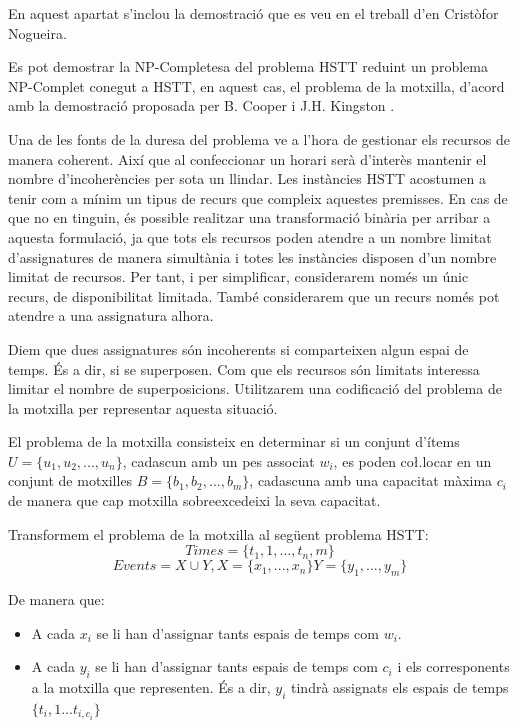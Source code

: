 \documentclass[11pt,a4paper,twoside]{report}
\begin{document}
    En aquest apartat s'inclou la demostració que es veu en el treball d'en Cristòfor Nogueira\cite{treballCristo}.
    
    Es pot demostrar la NP-Completesa del problema HSTT reduint un problema NP-Complet conegut a HSTT, en aquest cas, el problema de la motxilla\cite{wiki:bin}, d'acord amb la demostració proposada per B. Cooper i J.H. Kingston \cite{complexityHSTT}.

    Una de les fonts de la duresa del problema ve a l'hora de gestionar els recursos de manera coherent. Així que al confeccionar un horari serà d'interès mantenir el nombre d'incoherències per sota un llindar. 
    Les instàncies HSTT acostumen a tenir com a mínim un tipus de recurs que compleix aquestes premisses. 
    En cas de que no en tinguin, és possible realitzar una transformació binària per arribar a aquesta formulació, 
    ja que tots els recursos poden atendre a un nombre limitat d'assignatures de manera simultània i totes les instàncies disposen d'un nombre limitat de recursos. Per tant, i per simplificar, considerarem només un únic recurs, de disponibilitat limitada. També considerarem que un recurs només pot atendre a una assignatura alhora.

    Diem que dues assignatures són incoherents si comparteixen algun espai de temps. És a dir, si se superposen. Com que els recursos són limitats interessa limitar el nombre de superposicions. Utilitzarem una codificació del problema de la motxilla per representar aquesta situació.

    El problema de la motxilla consisteix en determinar si un conjunt d'ítems $U = \{u_1, u_2, ..., u_n\}$, cadascun amb un pes associat $w_i$, es poden co\l.locar en un conjunt de motxilles $B = \{b_1, b_2, ..., b_m\}$, 
    cadascuna amb una capacitat màxima $c_i$ de manera que cap motxilla sobreexcedeixi la seva capacitat.

    Transformem el problema de la motxilla al següent problema HSTT: 
    \[
        Times = \{t_1,1, ..., t_n,m\}
    \]\[
        Events = X \cup Y, X = \{x_1, ..., x_n\} Y = \{y_1, ..., y_m\}
    \]

    De manera que: 
    \begin{itemize}
      \item A cada $x_i$ se li han d'assignar tants espais de temps com $w_i$.
      \item A cada $y_i$ se li han d'assignar tants espais de temps com $c_i$ i els corresponents a la motxilla que representen. És a dir, $y_i$ tindrà assignats els espais de temps $\{t_i,1 ... t_{i,c_i}\}$
    \end{itemize}
    
\end{document}

